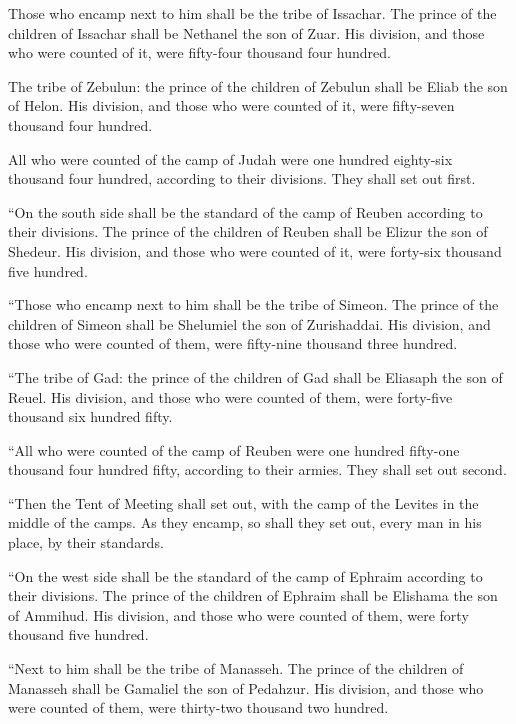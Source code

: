  Those who encamp next to him shall be the tribe of
Issachar. The prince of the children of Issachar shall be Nethanel the
son of Zuar.  His division, and those who were counted of
it, were fifty-four thousand four hundred.

 The tribe of Zebulun: the prince of the children of
Zebulun shall be Eliab the son of Helon.  His division,
and those who were counted of it, were fifty-seven thousand four
hundred.

 All who were counted of the camp of Judah were one
hundred eighty-six thousand four hundred, according to their divisions.
They shall set out first.

 ``On the south side shall be the standard of the camp of
Reuben according to their divisions. The prince of the children of
Reuben shall be Elizur the son of Shedeur.  His division,
and those who were counted of it, were forty-six thousand five hundred.

 ``Those who encamp next to him shall be the tribe of
Simeon. The prince of the children of Simeon shall be Shelumiel the son
of Zurishaddai.  His division, and those who were counted
of them, were fifty-nine thousand three hundred.

 ``The tribe of Gad: the prince of the children of Gad
shall be Eliasaph the son of Reuel.  His division, and
those who were counted of them, were forty-five thousand six hundred
fifty.

 ``All who were counted of the camp of Reuben were one
hundred fifty-one thousand four hundred fifty, according to their
armies. They shall set out second.

 ``Then the Tent of Meeting shall set out, with the camp
of the Levites in the middle of the camps. As they encamp, so shall they
set out, every man in his place, by their standards.

 ``On the west side shall be the standard of the camp of
Ephraim according to their divisions. The prince of the children of
Ephraim shall be Elishama the son of Ammihud.  His
division, and those who were counted of them, were forty thousand five
hundred.

 ``Next to him shall be the tribe of Manasseh. The prince
of the children of Manasseh shall be Gamaliel the son of Pedahzur.
 His division, and those who were counted of them, were
thirty-two thousand two hundred.

